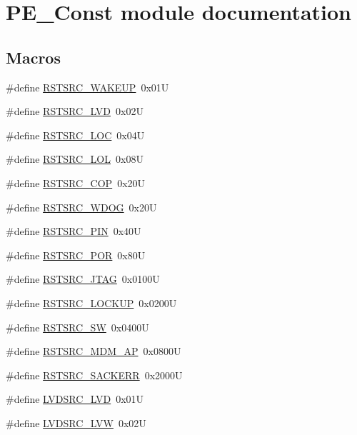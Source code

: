 \hypertarget{group___p_e___const__module}{}\section{P\+E\+\_\+\+Const module documentation}
\label{group___p_e___const__module}
\subsection*{Macros}
\begin{DoxyCompactItemize}
\item 
\#define \hyperlink{group___p_e___const__module_gaeed5dacbb9d0e07213c8840434f6cd6a}{R\+S\+T\+S\+R\+C\+\_\+\+W\+A\+K\+E\+UP}~0x01U
\item 
\#define \hyperlink{group___p_e___const__module_gae1c2803b0eda52457ab29cb138988581}{R\+S\+T\+S\+R\+C\+\_\+\+L\+VD}~0x02U
\item 
\#define \hyperlink{group___p_e___const__module_gabb1e7755f19390476da47c14af3c0a7d}{R\+S\+T\+S\+R\+C\+\_\+\+L\+OC}~0x04U
\item 
\#define \hyperlink{group___p_e___const__module_ga653fd4a8b1b389c8ee4f906182ac1638}{R\+S\+T\+S\+R\+C\+\_\+\+L\+OL}~0x08U
\item 
\#define \hyperlink{group___p_e___const__module_ga140be6eb76fc072ee4176e965b87b244}{R\+S\+T\+S\+R\+C\+\_\+\+C\+OP}~0x20U
\item 
\#define \hyperlink{group___p_e___const__module_ga789b8aee910293e98e3d259ced79864c}{R\+S\+T\+S\+R\+C\+\_\+\+W\+D\+OG}~0x20U
\item 
\#define \hyperlink{group___p_e___const__module_gabdcb9366c44b44d35909bdbf2fcf3d9d}{R\+S\+T\+S\+R\+C\+\_\+\+P\+IN}~0x40U
\item 
\#define \hyperlink{group___p_e___const__module_ga3511c871d0a516c574a91e1bac210238}{R\+S\+T\+S\+R\+C\+\_\+\+P\+OR}~0x80U
\item 
\#define \hyperlink{group___p_e___const__module_ga00a839ede0e69be1bc641f907de8b5f8}{R\+S\+T\+S\+R\+C\+\_\+\+J\+T\+AG}~0x0100U
\item 
\#define \hyperlink{group___p_e___const__module_ga46168abf3bfc8b58479ecace7641559b}{R\+S\+T\+S\+R\+C\+\_\+\+L\+O\+C\+K\+UP}~0x0200U
\item 
\#define \hyperlink{group___p_e___const__module_ga3c4274430f181cdab8c0c705df651784}{R\+S\+T\+S\+R\+C\+\_\+\+SW}~0x0400U
\item 
\#define \hyperlink{group___p_e___const__module_ga18886b7d76fe2b7babb3c16428f6af06}{R\+S\+T\+S\+R\+C\+\_\+\+M\+D\+M\+\_\+\+AP}~0x0800U
\item 
\#define \hyperlink{group___p_e___const__module_ga2bdec236f4f5002701b3672613078d95}{R\+S\+T\+S\+R\+C\+\_\+\+S\+A\+C\+K\+E\+RR}~0x2000U
\item 
\#define \hyperlink{group___p_e___const__module_gac31efdf3ba841e59289e3c11b5bf407c}{L\+V\+D\+S\+R\+C\+\_\+\+L\+VD}~0x01U
\item 
\#define \hyperlink{group___p_e___const__module_gafe8ffb97db9ede1045779df7d0eac3e4}{L\+V\+D\+S\+R\+C\+\_\+\+L\+VW}~0x02U
\end{DoxyCompactItemize}


